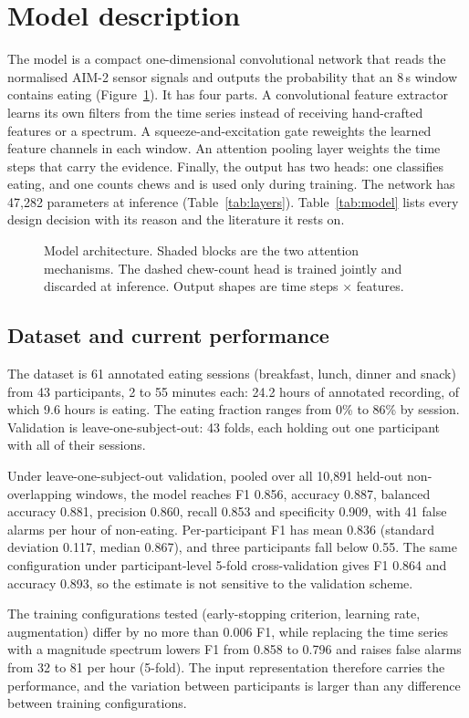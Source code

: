 \section{Model description}
\label{sec:model}

The model is a compact one-dimensional convolutional network that reads the
normalised AIM-2 sensor signals and outputs the probability that an 8\,s window
contains eating (Figure~\ref{fig:architecture}). It has four parts. A
convolutional feature extractor learns its own filters from the time series
instead of receiving hand-crafted features or a spectrum. A squeeze-and-excitation
gate reweights the learned feature channels in each window. An attention
pooling layer weights the time steps that carry the evidence. Finally, the
output has two heads: one classifies eating, and one counts chews and is used
only during training. The network has 47,282 parameters at inference
(Table~\ref{tab:layers}). Table~\ref{tab:model} lists every design decision
with its reason and the literature it rests on.

\begin{figure}[H]
\centering

\caption{Model architecture. Shaded blocks are the two attention mechanisms.
The dashed chew-count head is trained jointly and discarded at inference.
Output shapes are time steps × features.}
\label{fig:architecture}
\end{figure}





\subsection{Dataset and current performance}

The dataset is 61 annotated eating sessions (breakfast, lunch, dinner and
snack) from 43 participants, 2 to 55 minutes each: 24.2 hours of annotated
recording, of which 9.6 hours is eating. The eating fraction ranges from 0\%
to 86\% by session. Validation is leave-one-subject-out: 43 folds, each
holding out one participant with all of their sessions.

Under leave-one-subject-out validation, pooled over all 10,891 held-out
non-overlapping windows, the model reaches F1 0.856, accuracy 0.887,
balanced accuracy 0.881, precision 0.860, recall 0.853 and specificity
0.909, with 41 false alarms per hour of non-eating. Per-participant F1 has
mean 0.836 (standard deviation 0.117, median 0.867), and three participants
fall below 0.55. The same configuration under participant-level 5-fold
cross-validation gives F1 0.864 and accuracy 0.893, so the estimate is not
sensitive to the validation scheme.

The training configurations tested (early-stopping criterion, learning rate,
augmentation) differ by no more than 0.006 F1, while replacing the time
series with a magnitude spectrum lowers F1 from 0.858 to 0.796 and raises
false alarms from 32 to 81 per hour (5-fold). The input representation
therefore carries the performance, and the variation between participants
is larger than any difference between training configurations.

